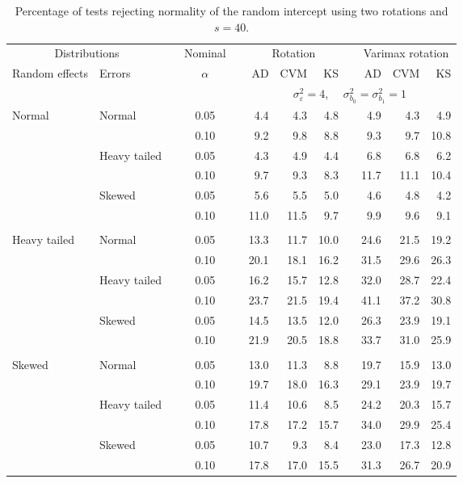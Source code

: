 \begin{table}[ht]
\centering
\caption{\label{tab:fixedsimb040} Percentage of tests rejecting normality of the random intercept using two rotations and $s = 40$.}
\begin{scriptsize}
\begin{tabular}{ll p{.1cm} c p{.1cm} rrr p{.1cm} rrr}
  \hline
  \multicolumn{2}{c}{Distributions}& & Nominal & &  \multicolumn{3}{c}{Rotation} & & \multicolumn{3}{c}{Varimax rotation} \\ \cline{1-2} \cline{6-8} \cline{10-12}   
  Random effects & Errors & & $\alpha$ & & AD & CVM & KS & & AD & CVM & KS \\ 
   \hline
& && && \multicolumn{7}{c}{$\sigma_{\varepsilon}^2 = 4$, \ \ $\sigma_{b_0}^2 = \sigma_{b_1}^2 = 1$} \\ \cline{6-12}
\rowcolor{gray!20} Normal & Normal &  & 0.05 &  & 4.4 & 4.3 & 4.8 &  & 4.9 & 4.3 & 4.9 \\ 
\rowcolor{gray!20}    &  &  & 0.10 &  & 9.2 & 9.8 & 8.8 &  & 9.3 & 9.7 & 10.8 \\ 
\rowcolor{gray!20}    & Heavy tailed &  & 0.05 &  & 4.3 & 4.9 & 4.4 &  & 6.8 & 6.8 & 6.2 \\ 
\rowcolor{gray!20}    &  &  & 0.10 &  & 9.7 & 9.3 & 8.3 &  & 11.7 & 11.1 & 10.4 \\ 
\rowcolor{gray!20}    & Skewed &  & 0.05 &  & 5.6 & 5.5 & 5.0 &  & 4.6 & 4.8 & 4.2 \\ 
\rowcolor{gray!20}    &  &  & 0.10 &  & 11.0 & 11.5 & 9.7 &  & 9.9 & 9.6 & 9.1 \\ 
&&&&&&&&&&&\\
  Heavy tailed & Normal &  & 0.05 &  & 13.3 & 11.7 & 10.0 &  & 24.6 & 21.5 & 19.2 \\ 
  &  &  & 0.10 &  & 20.1 & 18.1 & 16.2 &  & 31.5 & 29.6 & 26.3 \\ 
  & Heavy tailed &  & 0.05 &  & 16.2 & 15.7 & 12.8 &  & 32.0 & 28.7 & 22.4 \\ 
  &  &  & 0.10 &  & 23.7 & 21.5 & 19.4 &  & 41.1 & 37.2 & 30.8 \\ 
  & Skewed &  & 0.05 &  & 14.5 & 13.5 & 12.0 &  & 26.3 & 23.9 & 19.1 \\ 
  &  &  & 0.10 &  & 21.9 & 20.5 & 18.8 &  & 33.7 & 31.0 & 25.9 \\ 
&&&&&&&&&&&\\
  Skewed & Normal &  & 0.05 &  & 13.0 & 11.3 & 8.8 &  & 19.7 & 15.9 & 13.0 \\ 
  &  &  & 0.10 &  & 19.7 & 18.0 & 16.3 &  & 29.1 & 23.9 & 19.7 \\ 
  & Heavy tailed &  & 0.05 &  & 11.4 & 10.6 & 8.5 &  & 24.2 & 20.3 & 15.7 \\ 
  &  &  & 0.10 &  & 17.8 & 17.2 & 15.7 &  & 34.0 & 29.9 & 25.4 \\ 
  & Skewed &  & 0.05 &  & 10.7 & 9.3 & 8.4 &  & 23.0 & 17.3 & 12.8 \\ 
  &  &  & 0.10 &  & 17.8 & 17.0 & 15.5 &  & 31.3 & 26.7 & 20.9 \\ 


\end{tabular}
\end{scriptsize}
\end{table}
